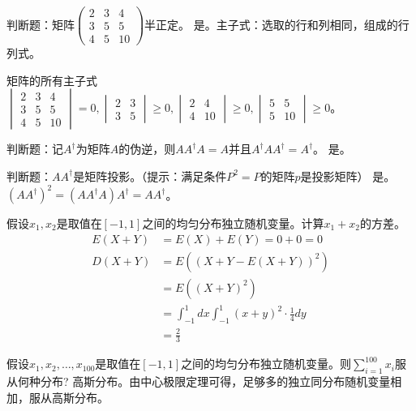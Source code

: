 \begin{problem}
	判断题：矩阵$\begin{pmatrix}
		2&3&4\\3&5&5\\4&5&10
	\end{pmatrix}$半正定。
	\solution 是。主子式：选取的行和列相同，组成的行列式。

	矩阵的所有主子式 $\begin{vmatrix}
		2 & 3 & 4 \\
		3 & 5 & 5 \\
		4 & 5 & 10 
	\end{vmatrix} = 0,\begin{vmatrix}
		2 & 3 \\
		3 & 5
	\end{vmatrix} \ge 0, \begin{vmatrix}
		2 & 4 \\ 
		4 & 10
	\end{vmatrix} \ge 0, \begin{vmatrix}
		5 & 5 \\
		5 & 10
	\end{vmatrix} \ge 0$。
\end{problem}

\begin{problem}
	判断题：记$A^{\dagger}$为矩阵$A$的伪逆，则$AA^\dagger A=A$并且$A^\dagger AA^\dagger=A^\dagger$。
	\solution 是。
\end{problem}

\begin{problem}
	判断题：$AA^\dagger$是矩阵投影。（提示：满足条件$P^2=P$的矩阵$p$是投影矩阵）
	\solution 是。$(AA^\dagger)^2 = (AA^\dagger A) A^\dagger = AA^\dagger$。
\end{problem}

\begin{problem}
	假设$x_1,x_2$是取值在$[-1,1]$之间的均匀分布独立随机变量。计算$x_1+x_2$的方差。
	\solution \begin{align*}
		E(X + Y) &= E(X) + E(Y) = 0 + 0 = 0\\
		D(X + Y) &= E((X + Y - E(X + Y))^2)\\
		&=E((X + Y)^2)\\
		&=\int_{-1}^{1}dx \int_{-1}^{1}(x + y)^2 \cdot \frac{1}{4} dy\\
		&=\frac{2}{3}
	\end{align*}
\end{problem}

\begin{problem}
	假设$x_1,x_2,\ldots,x_{100}$是取值在$[-1,1]$之间的均匀分布独立随机变量。则$\sum_{i=1}^{100}x_i$服从何种分布?
	\solution 高斯分布。由中心极限定理可得，足够多的独立同分布随机变量相加，服从高斯分布。
\end{problem}

